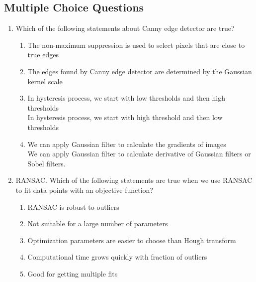 \documentclass[12pt,letterpaper]{article}
\begin{document}
\subsection{Multiple Choice Questions}
\begin{enumerate}
    \item Which of the following statements about Canny edge detector are true?
    \begin{enumerate}
        \item \color{red} The non-maximum suppression is used to select pixels that are close to true edges\color{black}
        \item \color{red}The edges found by Canny edge detector are determined by the Gaussian
kernel scale\color{black}
        \item In hysteresis process, we start with low thresholds and then high thresholds \\
        \color{blue}  In hysteresis process, we start with  high threshold and then low thresholds\color{black} 
        \item We can apply Gaussian filter to calculate the gradients of images\\
        \color{blue}We can apply Gaussian filter to calculate derivative of Gaussian filters or Sobel filters. \color{black}
    \end{enumerate}
    \item RANSAC. Which of the following statements are true when we use
RANSAC to fit data points with an objective function?
    \begin{enumerate}
        \item \color{red}RANSAC is robust to outliers \color{black}
        \item Not suitable for a large number of parameters
        \item \color{red}Optimization parameters are easier to choose than Hough transform \color{black}
        \item \color{red} Computational time grows quickly with fraction of outliers\color{black}
        \item Good for getting multiple fits
    \end{enumerate}
\end{enumerate}
\end{document}
